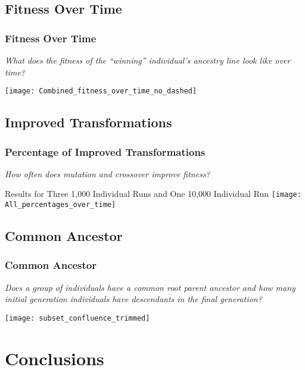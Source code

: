 \documentclass{beamer}
\begin{document}
\subsection[Fitness Graph]{Fitness Over Time}

\begin{frame}
\frametitle{Fitness Over Time}
\emph{What does the fitness of the ``winning'' individual's ancestry line look like over time?}
\begin{center}
\texttt{[image: Combined\_fitness\_over\_time\_no\_dashed]}
\end{center}
\end{frame}

\subsection[Improved Transformations]{Improved Transformations}

\begin{frame}
\frametitle{Percentage of Improved Transformations}
\emph{How often does mutation and crossover improve fitness?}
\begin{center}
{\tiny Results for Three 1,000 Individual Runs and One 10,000 Individual Run}
\texttt{[image: All\_percentages\_over\_time]}
\end{center}
\end{frame}

\subsection[Common Ancestor]{Common Ancestor}

\begin{frame}
\frametitle{Common Ancestor}
\emph{Does a group of individuals have a common root parent ancestor and how many initial generation individuals have descendants in the final generation?}
\begin{center}
\texttt{[image: subset\_confluence\_trimmed]}
\end{center}

\end{frame}

\section[Conclusions]{Conclusions}
\end{document}
